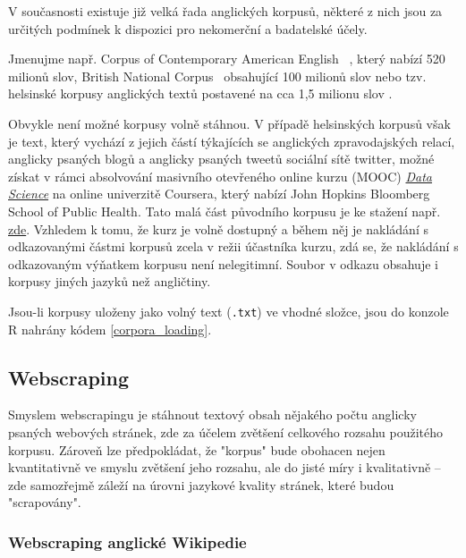 V současnosti existuje již velká řada anglických korpusů,
některé z nich
jsou za určitých podmínek k dispozici pro nekomerční a badatelské účely.

Jmenujme např. Corpus of Contemporary American English~\cite{Davies2010}%
,
který nabízí 520 milionů slov,
British National Corpus~\cite{Landow1993}
obsahující 100 milionů slov
nebo tzv. helsinské korpusy anglických textů
postavené na cca 1,5 milionu
slov \cite{Kytoo1996}.

Obvykle není možné korpusy volně stáhnou. V případě helsinských korpusů%
však je text, který vychází z jejich částí týkajících se anglických
zpravodajských relací, anglicky psaných blogů a anglicky psaných tweetů
sociální sítě \textsf{twitter}, možné získat v rámci absolvování masivního
otevřeného online kurzu (MOOC) \href{https://www.coursera.org/specializations%
/jhu-data-science/}{\textit{Data Science}} na online univerzitě
Coursera\textsuperscript{\textregistered}, který nabízí John Hopkins Bloomberg
School of Public Health. Tato malá část původního korpusu je ke stažení např.
\href{https://d396qusza40orc.cloudfront.net/dsscapstone/dataset%
/Coursera-SwiftKey.zip}{zde}. Vzhledem k tomu, že kurz je volně dostupný
a během něj je nakládání s odkazovanými částmi korpusů zcela v režii účastníka
kurzu, zdá se, že nakládání s odkazovaným výňatkem korpusu není nelegitimní.
Soubor v odkazu obsahuje i korpusy jiných jazyků než angličtiny.

Jsou-li korpusy uloženy jako volný text (\texttt{.txt}) ve vhodné složce,
jsou do konzole \textsf{R} nahrány kódem \ref{corpora_loading}.


\subsection{Webscraping}

Smyslem webscrapingu je stáhnout textový obsah nějakého
počtu anglicky psaných
webových stránek, zde za účelem zvětšení celkového rozsahu použitého korpusu.
Zároveň lze předpokládat, že "korpus" bude obohacen nejen kvantitativně ve
smyslu zvětšení jeho rozsahu, ale do jisté míry i kvalitativně -- zde
samozřejmě záleží na úrovni jazykové kvality stránek, které budou
"scrapovány".


\subsubsection{Webscraping anglické Wikipedie}

